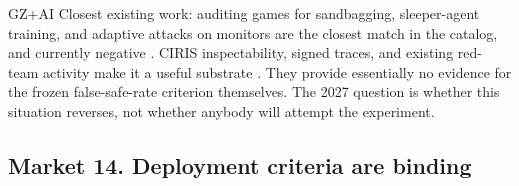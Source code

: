 \begin{authbar}{GZ+AI}
Closest existing work: auditing games for sandbagging, sleeper-agent training, and adaptive attacks on monitors are the closest match in the catalog, and currently negative \autocite{taylor2025sandbagging,hubinger2024sleeperagents,terekhov2025adaptiveattacks}.
CIRIS inspectability, signed traces, and existing red-team activity make it a useful substrate \autocite{ciris2026howitworks,cirisai2026agent}.
They provide essentially no evidence for the frozen false-safe-rate criterion themselves.
The 2027 question is whether this situation reverses, not whether anybody will attempt the experiment.
\end{authbar}
\authbarneedspace

\subsection{Market 14. Deployment criteria are binding}
\label{sec:appp-m14}

